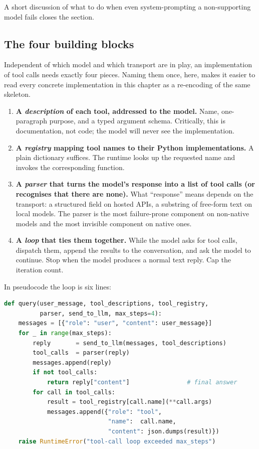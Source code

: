A short discussion of what to do when even system-prompting a
non-supporting model fails closes the section.

\subsection{The four building blocks}
\label{sec:impl-blocks}

Independent of which model and which transport are in play, an
implementation of tool calls needs exactly four pieces. Naming them
once, here, makes it easier to read every concrete implementation in
this chapter as a re-encoding of the same skeleton.

\begin{enumerate}[label=\textbf{(\arabic*)},leftmargin=2.2em,itemsep=0.4em]
\item \textbf{A \emph{description} of each tool, addressed to the
  model.} Name, one-paragraph purpose, and a typed argument schema.
  Critically, this is documentation, not code; the model will never
  see the implementation.
\item \textbf{A \emph{registry} mapping tool names to their Python
  implementations.} A plain dictionary suffices. The runtime looks up
  the requested name and invokes the corresponding function.
\item \textbf{A \emph{parser} that turns the model's response into a
  list of tool calls (or recognises that there are none).} What
  ``response'' means depends on the transport: a structured field on
  hosted APIs, a substring of free-form text on local models. The
  parser is the most failure-prone component on non-native models
  and the most invisible component on native ones.
\item \textbf{A \emph{loop} that ties them together.} While the model
  asks for tool calls, dispatch them, append the results to the
  conversation, and ask the model to continue. Stop when the model
  produces a normal text reply. Cap the iteration count.
\end{enumerate}

In pseudocode the loop is six lines:

\begin{lstlisting}[language=Python,caption={LLM-agnostic skeleton of a tool-calling client.},label=lst:skeleton]
def query(user_message, tool_descriptions, tool_registry,
          parser, send_to_llm, max_steps=4):
    messages = [{"role": "user", "content": user_message}]
    for _ in range(max_steps):
        reply       = send_to_llm(messages, tool_descriptions)
        tool_calls  = parser(reply)
        messages.append(reply)
        if not tool_calls:
            return reply["content"]                # final answer
        for call in tool_calls:
            result = tool_registry[call.name](**call.args)
            messages.append({"role": "tool",
                             "name":  call.name,
                             "content": json.dumps(result)})
    raise RuntimeError("tool-call loop exceeded max_steps")
\end{lstlisting}

